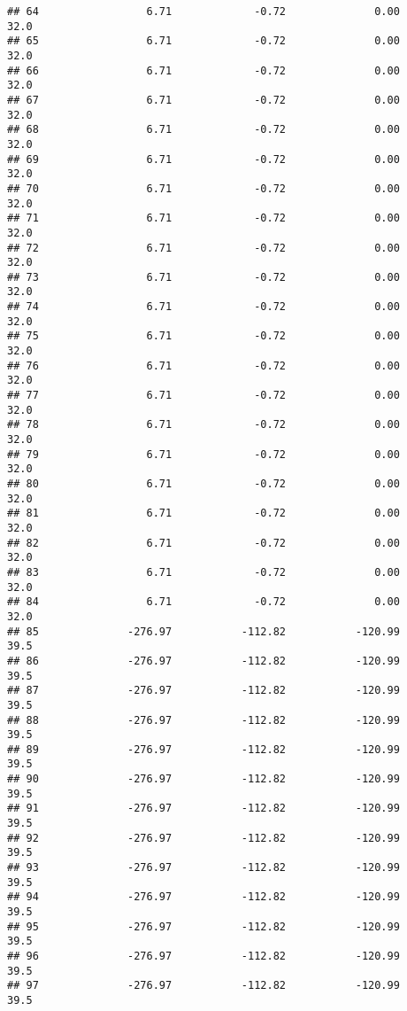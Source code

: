 \documentclass[]{article}
\begin{document}
\begin{verbatim}
## 64                 6.71             -0.72              0.00           32.0
## 65                 6.71             -0.72              0.00           32.0
## 66                 6.71             -0.72              0.00           32.0
## 67                 6.71             -0.72              0.00           32.0
## 68                 6.71             -0.72              0.00           32.0
## 69                 6.71             -0.72              0.00           32.0
## 70                 6.71             -0.72              0.00           32.0
## 71                 6.71             -0.72              0.00           32.0
## 72                 6.71             -0.72              0.00           32.0
## 73                 6.71             -0.72              0.00           32.0
## 74                 6.71             -0.72              0.00           32.0
## 75                 6.71             -0.72              0.00           32.0
## 76                 6.71             -0.72              0.00           32.0
## 77                 6.71             -0.72              0.00           32.0
## 78                 6.71             -0.72              0.00           32.0
## 79                 6.71             -0.72              0.00           32.0
## 80                 6.71             -0.72              0.00           32.0
## 81                 6.71             -0.72              0.00           32.0
## 82                 6.71             -0.72              0.00           32.0
## 83                 6.71             -0.72              0.00           32.0
## 84                 6.71             -0.72              0.00           32.0
## 85              -276.97           -112.82           -120.99           39.5
## 86              -276.97           -112.82           -120.99           39.5
## 87              -276.97           -112.82           -120.99           39.5
## 88              -276.97           -112.82           -120.99           39.5
## 89              -276.97           -112.82           -120.99           39.5
## 90              -276.97           -112.82           -120.99           39.5
## 91              -276.97           -112.82           -120.99           39.5
## 92              -276.97           -112.82           -120.99           39.5
## 93              -276.97           -112.82           -120.99           39.5
## 94              -276.97           -112.82           -120.99           39.5
## 95              -276.97           -112.82           -120.99           39.5
## 96              -276.97           -112.82           -120.99           39.5
## 97              -276.97           -112.82           -120.99           39.5

\end{verbatim}
\end{document}
